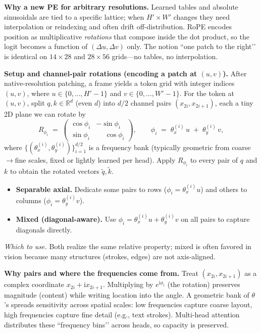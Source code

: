 \begin{enrichment}
\begin{enrichment}
        \textbf{Why a new PE for arbitrary resolutions.} \;
        Learned tables and absolute sinusoidals are tied to a specific lattice; when $H'\!\times W'$ changes they need interpolation or reindexing and often drift off\mbox{-}distribution. RoPE encodes position as multiplicative \emph{rotations} that compose inside the dot product, so the logit becomes a function of $(\Delta u,\Delta v)$ only. The notion “one patch to the right’’ is identical on $14{\times}28$ and $28{\times}56$ grids—no tables, no interpolation.
        
        \textbf{Setup and channel\mbox{-}pair rotations (encoding a patch at $(u,v)$).} \;
        After native\mbox{-}resolution patching, a frame yields a token grid with integer indices $(u,v)$, where $u\!\in\!\{0,\dots,H'-1\}$ and $v\!\in\!\{0,\dots,W'-1\}$. For the token at $(u,v)$, split $q,k\!\in\!\mathbb{R}^{d}$ (even $d$) into $d/2$ channel pairs $(x_{2i},x_{2i+1})$, each a tiny 2D plane we can rotate by
        \[
        R_{\phi_i} \;=\;
        \begin{pmatrix}
            \cos\phi_i & -\sin\phi_i\\
            \sin\phi_i & \phantom{-}\cos\phi_i
        \end{pmatrix},
        \qquad
        \phi_i \;=\; \theta_x^{(i)}\,u \;+\; \theta_y^{(i)}\,v,
        \]
        where $\{(\theta_x^{(i)},\theta_y^{(i)})\}_{i=1}^{d/2}$ is a frequency bank (typically geometric from coarse$\!\to\!$fine scales, fixed or lightly learned per head). Apply $R_{\phi_i}$ to every pair of $q$ and $k$ to obtain the rotated vectors $\tilde q,\tilde k$.
        
        \begin{itemize}
            \item \textbf{Separable axial.} Dedicate some pairs to rows ($\phi_i=\theta_x^{(i)}u$) and others to columns ($\phi_i=\theta_y^{(i)}v$).
            \item \textbf{Mixed (diagonal\mbox{-}aware).} Use $\phi_i=\theta_x^{(i)}u+\theta_y^{(i)}v$ on all pairs to capture diagonals directly.
        \end{itemize}
        \emph{Which to use.} Both realize the same relative property; mixed is often favored in vision because many structures (strokes, edges) are not axis\mbox{-}aligned.
        
        \textbf{Why pairs and where the frequencies come from.} \;
        Treat $(x_{2i},x_{2i+1})$ as a complex coordinate $x_{2i}+\mathrm{i}x_{2i+1}$. Multiplying by $e^{\mathrm{i}\phi_i}$ (the rotation) preserves magnitude (content) while writing location into the angle. A geometric bank of $\theta$’s spreads sensitivity across spatial scales: low frequencies capture coarse layout, high frequencies capture fine detail (e.g., text strokes). Multi\mbox{-}head attention distributes these “frequency bins’’ across heads, so capacity is preserved.
        

\end{enrichment}
\end{enrichment}
